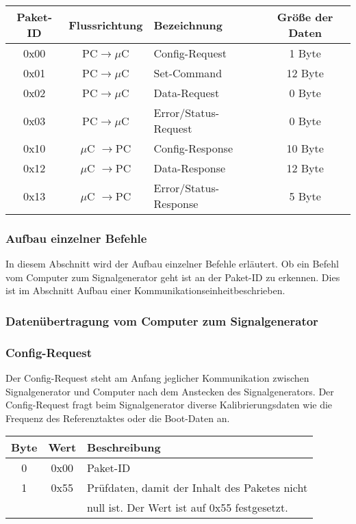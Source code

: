 \begin{tabular}{c||c|l|c}
Paket-ID & Flussrichtung & Bezeichnung & Größe der Daten \\ 
\hline 
\hline
0x00 & PC$\rightarrow \mu$C & Config-Request & 1 Byte \\ 
\hline 
0x01 & PC$\rightarrow \mu$C & Set-Command & 12 Byte \\ 
\hline 
0x02 & PC$\rightarrow \mu$C & Data-Request & 0 Byte \\ 
\hline 
0x03 & PC$\rightarrow \mu$C & Error/Status-Request & 0 Byte \\ 
\hline 
0x10 & $\mu$C $\rightarrow$PC & Config-Response & 10 Byte \\  
\hline 
0x12 & $\mu$C $\rightarrow$PC & Data-Response & 12 Byte \\ 
\hline
0x13 & $\mu$C $\rightarrow$PC & Error/Status-Response & 5 Byte \\ 
\end{tabular}

\subsubsection{Aufbau einzelner Befehle}
In diesem Abschnitt wird der Aufbau einzelner Befehle erläutert. Ob ein Befehl vom Computer zum Signalgenerator geht ist an der Paket-ID zu erkennen. Dies ist im Abschnitt \glqq Aufbau einer Kommunikationseinheit\grqq beschrieben.

\pagebreak
\subsubsection*{Datenübertragung vom Computer zum Signalgenerator}

\subsubsection*{Config-Request}
Der Config-Request steht am Anfang jeglicher Kommunikation zwischen Signalgenerator und Computer nach dem Anstecken des Signalgenerators. Der Config-Request fragt beim Signalgenerator diverse Kalibrierungsdaten wie die Frequenz des Referenztaktes oder die Boot-Daten an.

\begin{flushleft}
\begin{tabular}{c||c|l}
Byte & Wert & Beschreibung \\
\hline
\hline
0 & 0x00 & Paket-ID \\
\hline
1 & 0x55 & Prüfdaten, damit der Inhalt des Paketes nicht \\
& & null ist. Der Wert ist auf 0x55 festgesetzt.\\
\end{tabular}
\end{flushleft}

